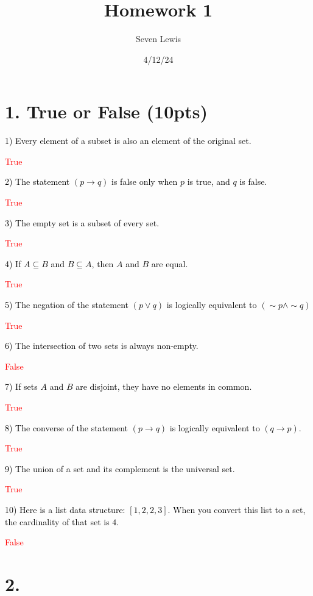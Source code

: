 \documentclass{article}
\title{Homework 1}
\author{Seven Lewis}
\date{4/12/24}
\newcommand{\problem}[1]{\noindent\textcolor{black}{#1}}
\newcommand{\solution}[1]{\noindent\textcolor{red}{#1}}
\begin{document}
\maketitle

\section*{1. True or False (10pts)}
\problem{1)	Every element of a subset is also an element of the original set.}

\solution{True}


\problem{2) The statement $(p \rightarrow q)$ is false only when $p$ is true, and $q$ is false.}

\solution{True}


\problem{3) The empty set is a subset of every set.}

\solution{True}


\problem{4) If $A \subseteq B$ and $B \subseteq A$, then $A$ and $B$ are equal.}

\solution{True}
 

\problem{5) The negation of the statement $(p \lor q)$ is logically equivalent to $(\sim p \land \sim q)$}

\solution{True}


\problem{6) The intersection of two sets is always non-empty.}

\solution{False}


\problem{7) If sets $A$ and $B$ are disjoint, they have no elements in common.}

\solution{True}


\problem{8) The converse of the statement $(p \rightarrow q)$ is logically equivalent to $(q \rightarrow p)$.}

\solution{True}

\problem{9) The union of a set and its complement is the universal set.}

\solution{True}

\problem{10) Here is a list data structure: $[1,2,2,3]$. When you convert this list to a set, the cardinality of that set is $4$.}

\solution{False}



\vspace*{27em}


\section*{2. }
\end{document}
